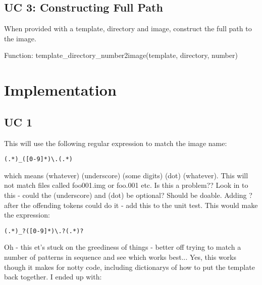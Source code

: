 \documentclass[a4paper, 11pt]{article}
\begin{document}
\subsection{UC 3: Constructing Full Path}

When provided with a template, directory and image, construct the full path
to the image.

Function: template\_directory\_number2image(template, directory, number)

\section{Implementation}

\subsection{UC 1}

This will use the following regular expression to match the image name:

{
\tiny
\begin{verbatim}
(.*)_([0-9]*)\.(.*)
\end{verbatim}
}

which means (whatever) (underscore) (some digits) (dot) (whatever). This will
not match files called foo001.img or foo.001 etc. Is this a problem?? Look 
in to this - could the (underscore) and (dot) be optional? Should be doable.
Adding ? after the offending tokens could do it - add this to the unit test.
This would make the expression:

{
\tiny
\begin{verbatim}
(.*)_?([0-9]*)\.?(.*)?
\end{verbatim}
}

Oh - this et's stuck on the greediness of things - better off trying to 
match a number of patterns in sequence and see which works best... Yes, this
works though it makes for notty code, including dictionarys of how to put
the template back together. I ended up with:
\end{document}
